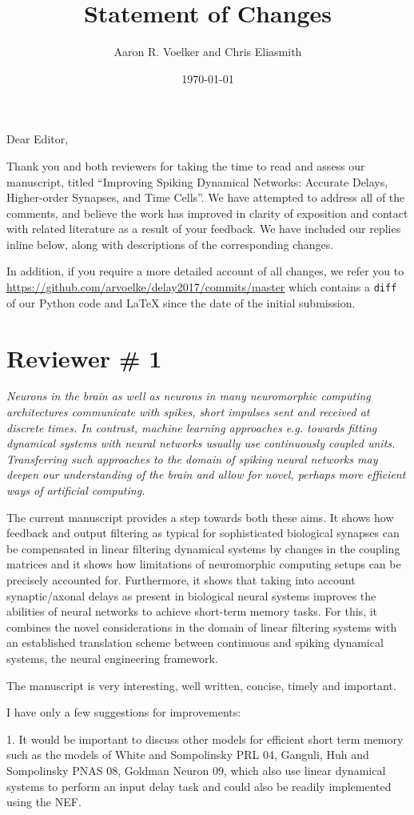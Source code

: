 \documentclass[a4paper]{article}
\title{Statement of Changes}
\author{Aaron R. Voelker and Chris Eliasmith}
\date{\today}
\newcommand{\newl}{\par\null\par}
\newcommand{\REVIEW}[1]{{\it #1}}
\begin{document}
\maketitle


Dear Editor,
\newl
Thank you and both reviewers for taking the time to read and assess our manuscript, titled ``Improving Spiking Dynamical Networks: Accurate Delays, Higher-order Synapses, and Time Cells''. 
We have attempted to address all of the comments, and believe the work has improved in clarity of exposition and contact with related literature as a result of your feedback.
We have included our replies inline below, along with descriptions of the corresponding changes.
\newl
In addition, if you require a more detailed account of all changes, we refer you to \url{https://github.com/arvoelke/delay2017/commits/master} which contains a \texttt{diff} of our Python code and \LaTeX{} since the date of the initial submission.

\section*{Reviewer \# 1}

\REVIEW{Neurons in the brain as well as neurons in many neuromorphic computing architectures communicate with spikes, short impulses sent and received at discrete times. In contrast, machine learning approaches e.g. towards fitting dynamical systems with neural networks usually use continuously coupled units. Transferring such approaches to the domain of spiking neural networks may deepen our understanding of the brain and allow for novel, perhaps more efficient ways of artificial computing.
\newl
The current manuscript provides a step towards both these aims. It shows how feedback and output filtering as typical for sophisticated biological synapses can be compensated in linear filtering dynamical systems by changes in the coupling matrices and it shows how limitations of neuromorphic computing setups can be precisely accounted for. Furthermore, it shows that taking into account synaptic/axonal delays as present in biological neural systems improves the abilities of neural networks to achieve short-term memory tasks. For this, it combines the novel considerations in the domain of linear filtering systems with an established translation scheme between continuous and spiking dynamical systems, the neural engineering framework.
\newl
The manuscript is very interesting, well written, concise, timely and important.
\newl
I have only a few suggestions for improvements:
\newl
1. It would be important to discuss other models for efficient short term memory such as the models of White and Sompolinsky PRL 04, Ganguli, Huh and Sompolinsky PNAS 08, Goldman Neuron 09, which also use linear dynamical systems to perform an input delay task and could also be readily implemented using the NEF.}
\end{document}
